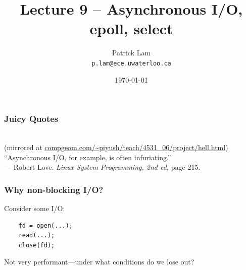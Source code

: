 

\title{Lecture 9 -- Asynchronous I/O, epoll, select }

\author{Patrick Lam \\ \small \texttt{p.lam@ece.uwaterloo.ca}}
\date{\today}




\begin{frame}
  \titlepage

 \end{frame}

\begin{frame}
  \frametitle{Juicy Quotes}


  \\
{\scriptsize (mirrored at \url{compgeom.com/~piyush/teach/4531_06/project/hell.html})}
   \\[3em]

   ``Asynchronous I/O, for example, is often infuriating.''\\
--- Robert Love. {\em Linux System Programming, 2nd ed, } page 215.
  

\end{frame}

\begin{frame}[fragile]
  \frametitle{Why non-blocking I/O?}
  
  Consider some I/O:


\begin{minipage}{.5\textwidth}
\begin{lstlisting}
    fd = open(...);
    read(...);
    close(fd);
  \end{lstlisting}
\end{minipage}


  Not very performant---under what conditions do we lose out?

\end{frame}

